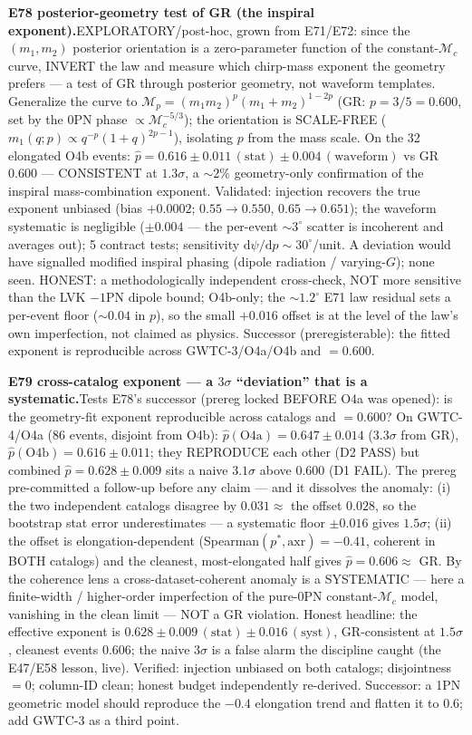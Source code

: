\documentclass[10pt]{article}
\newcommand{\entry}[2]{\vspace{5pt}\noindent\textbf{#1}\quad #2\par}
\begin{document}
\entry{E78 posterior-geometry test of GR (the inspiral exponent).}{EXPLORATORY/post-hoc, grown from
E71/E72: since the $(m_1,m_2)$ posterior orientation is a zero-parameter function of the constant-$\mathcal{M}_c$
curve, INVERT the law and measure which chirp-mass exponent the geometry prefers --- a test of GR through
posterior geometry, not waveform templates. Generalize the curve to $\mathcal{M}_p=(m_1 m_2)^p(m_1+m_2)^{1-2p}$
(GR: $p=3/5=0.600$, set by the 0PN phase $\propto\mathcal{M}_c^{-5/3}$); the orientation is SCALE-FREE
($m_1(q;p)\propto q^{-p}(1+q)^{2p-1}$), isolating $p$ from the mass scale. On the 32 elongated O4b events:
$\hat p = 0.616\pm0.011\,(\mathrm{stat})\pm0.004\,(\mathrm{waveform})$ vs GR $0.600$ --- CONSISTENT at
$1.3\sigma$, a $\sim2$\% geometry-only confirmation of the inspiral mass-combination exponent. Validated:
injection recovers the true exponent unbiased (bias $+0.0002$; $0.55\to0.550$, $0.65\to0.651$); the waveform
systematic is negligible ($\pm0.004$ --- the per-event $\sim3^\circ$ scatter is incoherent and averages out);
5 contract tests; sensitivity $\mathrm{d}\psi/\mathrm{d}p\sim30^\circ$/unit. A deviation would have signalled
modified inspiral phasing (dipole radiation / varying-$G$); none seen. HONEST: a methodologically independent
cross-check, NOT more sensitive than the LVK $-1$PN dipole bound; O4b-only; the $\sim1.2^\circ$ E71 law
residual sets a per-event floor ($\sim0.04$ in $p$), so the small $+0.016$ offset is at the level of the law's
own imperfection, not claimed as physics. Successor (preregisterable): the fitted exponent is reproducible
across GWTC-3/O4a/O4b and $=0.600$.}

\entry{E79 cross-catalog exponent --- a $3\sigma$ ``deviation'' that is a systematic.}{Tests E78's successor
(prereg locked BEFORE O4a was opened): is the geometry-fit exponent reproducible across catalogs and
$=0.600$? On GWTC-4/O4a (86 events, disjoint from O4b): $\hat p(\mathrm{O4a})=0.647\pm0.014$ ($3.3\sigma$
from GR), $\hat p(\mathrm{O4b})=0.616\pm0.011$; they REPRODUCE each other (D2 PASS) but combined
$\hat p=0.628\pm0.009$ sits a naive $3.1\sigma$ above $0.600$ (D1 FAIL). The prereg pre-committed a
follow-up before any claim --- and it dissolves the anomaly: (i) the two independent catalogs disagree by
$0.031\approx$ the offset $0.028$, so the bootstrap stat error underestimates --- a systematic floor
$\pm0.016$ gives $1.5\sigma$; (ii) the offset is elongation-dependent (Spearman$(p^*,\mathrm{axr})=-0.41$,
coherent in BOTH catalogs) and the cleanest, most-elongated half gives $\hat p=0.606\approx$ GR. By the
coherence lens a cross-dataset-coherent anomaly is a SYSTEMATIC --- here a finite-width / higher-order
imperfection of the pure-0PN constant-$\mathcal{M}_c$ model, vanishing in the clean limit --- NOT a GR
violation. Honest headline: the effective exponent is $0.628\pm0.009\,(\mathrm{stat})\pm0.016\,(\mathrm{syst})$,
GR-consistent at $1.5\sigma$, cleanest events $0.606$; the naive $3\sigma$ is a false alarm the discipline
caught (the E47/E58 lesson, live). Verified: injection unbiased on both catalogs; disjointness $=0$;
column-ID clean; honest budget independently re-derived. Successor: a 1PN geometric model should reproduce
the $-0.4$ elongation trend and flatten it to $0.6$; add GWTC-3 as a third point.}
\end{document}
